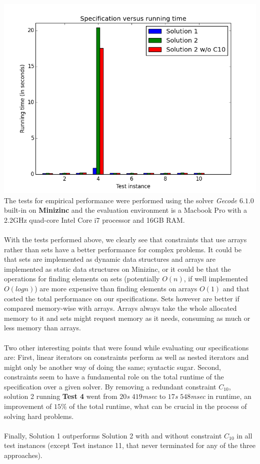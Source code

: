 \documentclass[conference]{IEEEtran}
\newcommand\tab[1][0.3cm]{\hspace*{#1}}
\begin{document}
\includegraphics[scale=0.4]{comparizon_img.png}\\
\tab The tests for empirical performance were performed using the solver \textit{Gecode $6.1.0$} built-in on \textbf{Minizinc} and the evaluation environment is a Macbook Pro with a 2.2GHz quad-core Intel Core i7 processor and 16GB RAM.
\\
\\
\tab With the tests performed above, we clearly see that constraints that use arrays rather than sets have a better performance for complex problems. It could be that sets are implemented as dynamic data structures and arrays are implemented as static data structures on Minizinc, or it could be that the operations for finding elements on sets (potentially $O(n)$, if well implemented $O(logn)$) are more expensive than finding elements on arrays $O(1)$ and that costed the total performance on our specifications. Sets however are better if compared memory-wise with arrays. Arrays always take the whole allocated memory to it and sets might request memory as it needs, consuming as much or less memory than arrays.
\\
\\
Two other interesting points that were found while evaluating our specifications are: First, linear iterators on constraints perform as well as nested iterators and might only be another way of doing the same; syntactic sugar. Second, constraints seem to have a fundamental role on the total runtime of the specification over a given solver. By removing a redundant constraint $C_{10}$, solution 2 running \textbf{Test 4} went from $20$\textit{s} $419$\textit{msec} to $17$\textit{s} $548$\textit{msec} in runtime, an improvement of $15\%$ of the total runtime, what can be crucial in the process of solving hard problems.
\\
\\
Finally, Solution 1 outperforms Solution 2 with and without constraint $C_{10}$ in all test instances (except Test instance 11, that never terminated for any of the three approaches).
\end{document}
